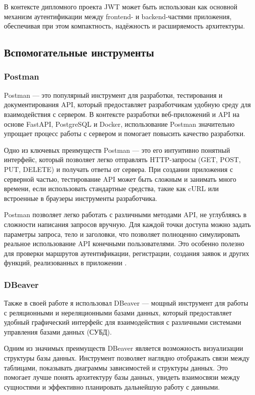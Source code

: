 \documentclass[diploma]{SCWorks}
\begin{document}
В контексте дипломного проекта JWT может быть использован как основной 
механизм аутентификации между frontend- и backend-частями приложения, 
обеспечивая при этом компактность, надёжность и расширяемость архитектуры.

\subsection{Вспомогательные инструменты}

\subsubsection{Postman}

Postman — это популярный инструмент для разработки, тестирования и 
документирования API, который предоставляет разработчикам удобную среду для 
взаимодействия с сервером. В контексте разработки веб-приложений и API на 
основе FastAPI, PostgreSQL и Docker, использование Postman значительно упрощает 
процесс работы с сервером и помогает повысить качество разработки.

Одно из ключевых преимуществ Postman — это его интуитивно понятный интерфейс, 
который позволяет легко отправлять HTTP-запросы (GET, POST, PUT, DELETE) и 
получать ответы от сервера. При создании приложения с серверной частью, 
тестирование API может быть сложным и занимать много времени, если 
использовать стандартные средства, такие как cURL или встроенные в браузеры 
инструменты разработчика. 

Postman позволяет легко работать с различными методами API, не углубляясь в 
сложности написания запросов вручную. Для каждой точки доступа можно задать 
параметры запроса, тело и заголовки, что позволяет полноценно симулировать 
реальное использование API конечными пользователями. Это особенно полезно для 
проверки маршрутов аутентификации, регистрации, создания заявок и других 
функций, реализованных в приложении \cite{postman}.

\subsubsection{DBeaver}

Также в своей работе я использовал DBeaver — мощный инструмент для работы с 
реляционными и нереляционными базами данных, который предоставляет удобный 
графический интерфейс для взаимодействия с различными системами управления 
базами данных (СУБД).

Одним из значимых преимуществ DBeaver является возможность визуализации 
структуры базы данных. Инструмент позволяет наглядно отображать связи между 
таблицами, показывать диаграммы зависимостей и структуры данных. 
Это помогает лучше понять архитектуру базы данных, увидеть взаимосвязи между 
сущностями и эффективно планировать дальнейшую работу с данными.
\end{document}
